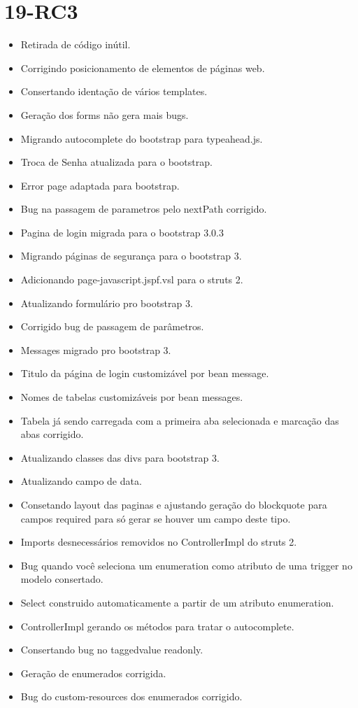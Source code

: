 \section{19-RC3}

\begin{itemize}
  \item Retirada de código inútil.
  \item Corrigindo posicionamento de elementos de páginas web.
  \item Consertando identação de vários templates.
  \item Geração dos forms não gera mais bugs.
  \item Migrando autocomplete do bootstrap para typeahead.js.
  \item Troca de Senha atualizada para o bootstrap.
  \item Error page adaptada para bootstrap.
  \item Bug na passagem de parametros pelo nextPath corrigido.
  \item Pagina de login migrada para o bootstrap 3.0.3
  \item Migrando páginas de segurança para o bootstrap 3.
  \item Adicionando page-javascript.jspf.vsl para o struts 2.
  \item Atualizando formulário pro bootstrap 3.
  \item Corrigido bug de passagem de parâmetros.
  \item Messages migrado pro bootstrap 3.
  \item Titulo da página de login customizável por bean message.
  \item Nomes de tabelas customizáveis por bean messages.
  \item Tabela já sendo carregada com a primeira aba selecionada e marcação das
abas corrigido.
  \item Atualizando classes das divs para bootstrap 3.
  \item Atualizando campo de data.
  \item Consetando layout das paginas e ajustando geração do blockquote para
campos required para só gerar se houver um campo deste tipo.
  \item Imports desnecessários removidos no ControllerImpl do struts 2.
  \item Bug quando você seleciona um enumeration como atributo de uma trigger no
modelo consertado.
  \item Select construido automaticamente a partir de um atributo enumeration.
  \item ControllerImpl gerando os métodos para tratar o autocomplete.
  \item Consertando bug no taggedvalue readonly.
  \item Geração de enumerados corrigida.
  \item Bug do custom-resources dos enumerados corrigido.
\end{itemize}

